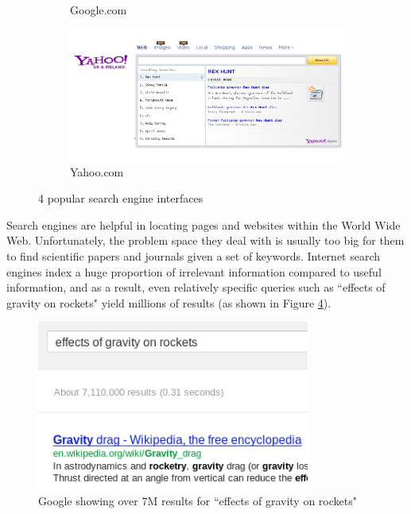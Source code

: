 \documentclass[12pt,a4paper]{article}
\begin{document}
\begin{figure}[!ht]
\begin{subfigure}[b]{0.50\textwidth}
                \caption{Google.com}
                \label{fig:google_interface}
        \end{subfigure}%
        \begin{subfigure}[b]{0.50\textwidth}
                \centering
                \includegraphics[width=\textwidth]{images/yahoo_front.png}
                \caption{Yahoo.com}
                \label{fig:yahoo_interface}
        \end{subfigure}%
        \caption{4 popular search engine interfaces}\label{fig:animals}
        \label{fig:search_interfaces}
\end{figure}


Search engines are helpful in locating pages and websites within the World Wide
Web. Unfortunately, the problem space they deal with is usually too big for
them to find scientific papers and journals given a set of keywords. Internet
search engines index a huge proportion of irrelevant information compared to
useful information\cite{Berghel1997}, and as a result, even relatively specific
queries such as ``effects of gravity on rockets" yield millions of results (as
shown in Figure \ref{fig:rocket_results}). 

\begin{figure}[!ht]
\includegraphics[width=0.80\textwidth]{images/space_rocket_query.png}
\caption{{Google showing over 7M results for ``effects of gravity on rockets"}}
\label{fig:rocket_results}
\end{figure}
\end{document}
